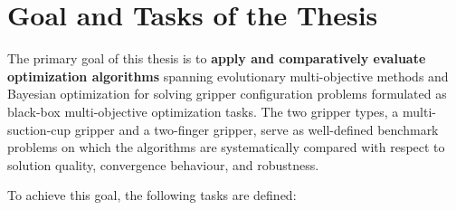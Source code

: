 \section{Goal and Tasks of the Thesis}
\label{sec:goals_tasks}

The primary goal of this thesis is to \textbf{apply and comparatively evaluate optimization algorithms} spanning evolutionary multi-objective methods
and Bayesian optimization for solving gripper configuration problems formulated as black-box multi-objective optimization
tasks\cite{Datta2011Optimizing,Belakaria2020Uncertainty-Aware}. The two gripper types, a multi-suction-cup gripper and a two-finger gripper, serve as
well-defined benchmark problems on which the algorithms are systematically compared with respect to solution quality, convergence behaviour, and
robustness.

To achieve this goal, the following tasks are defined:

